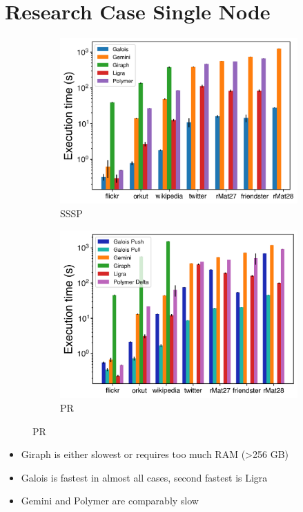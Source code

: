 \documentclass{meetings}
\begin{document}
\section{Research Case Single Node}

\begin{figure}[h]
	\begin{subfigure}{0.45\textwidth}
		\includegraphics[width=\linewidth]{../../plots/singleNodeSSSP_execTime.png}
		\caption{SSSP}
		\label{fig:singleNodeSSSP_exec}
	\end{subfigure}
	\hfil
	\begin{subfigure}{0.45\textwidth}
		\includegraphics[width=\linewidth]{../../plots/singleNodePR_execTime.png}
		\caption{PR}
		\label{fig:singleNodeSSSP_exec}
	\end{subfigure}
\end{figure}
\begin{itemize}
	\item Giraph is either slowest or requires too much RAM (>256 GB)
	\item Galois is fastest in almost all cases, second fastest is Ligra
	\item Gemini and Polymer are comparably slow
\end{itemize}
\end{document}

